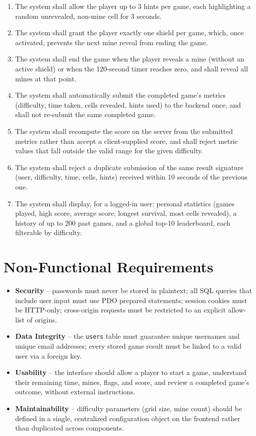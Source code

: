 \begin{enumerate}[nosep]
    automatically revealing the remaining unflagged neighbours.
    \item The system shall allow the player up to 3 hints per game, each
    highlighting a random unrevealed, non-mine cell for 3 seconds.
    \item The system shall grant the player exactly one shield per game,
    which, once activated, prevents the next mine reveal from ending the
    game.
    \item The system shall end the game when the player reveals a mine
    (without an active shield) or when the 120-second timer reaches zero,
    and shall reveal all mines at that point.
    \item The system shall automatically submit the completed game's
    metrics (difficulty, time taken, cells revealed, hints used) to the
    backend once, and shall not re-submit the same completed game.
    \item The system shall recompute the score on the server from the
    submitted metrics rather than accept a client-supplied score, and shall
    reject metric values that fall outside the valid range for the given
    difficulty.
    \item The system shall reject a duplicate submission of the same result
    signature (user, difficulty, time, cells, hints) received within 10
    seconds of the previous one.
    \item The system shall display, for a logged-in user: personal
    statistics (games played, high score, average score, longest survival,
    most cells revealed), a history of up to 200 past games, and a global
    top-10 leaderboard, each filterable by difficulty.
\end{enumerate}

\section{Non-Functional Requirements}
\begin{itemize}[nosep]
    \item \textbf{Security} -- passwords must never be stored in plaintext;
    all SQL queries that include user input must use PDO prepared
    statements; session cookies must be HTTP-only; cross-origin requests
    must be restricted to an explicit allow-list of origins.
    \item \textbf{Data Integrity} -- the \texttt{users} table must guarantee
    unique usernames and unique email addresses; every stored game result
    must be linked to a valid user via a foreign key.
    \item \textbf{Usability} -- the interface should allow a player to start
    a game, understand their remaining time, mines, flags, and score, and
    review a completed game's outcome, without external instructions.
    \item \textbf{Maintainability} -- difficulty parameters (grid size, mine
    count) should be defined in a single, centralized configuration object
    on the frontend rather than duplicated across components.
\end{itemize}


